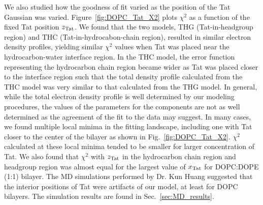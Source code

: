 We also studied how the goodness of fit varied as the position of 
the Tat Gaussian was varied. Figure~\ref{fig:DOPC_Tat_X2} plots $\chi^2$ as a 
function of the fixed Tat position $z_\textrm{Tat}$. We found that the two models,
THG (Tat-in-headgroup region) and THC (Tat-in-hydrocabon-chain region), resulted 
in similar electron density profiles, yielding similar $\chi^2$ values 
when Tat was placed near the hydrocarbon-water interface region. In the THC model, 
the error function representing the hydrocarbon chain region became wider as
Tat was placed closer to the interface region such that 
the total density profile calculated from the THC model was very similar to that calculated 
from the THG model.
In general, while the total electron density profile is well determined by 
our modeling procedures, the values of the parameters for the components are 
not as well determined as the agreement of the fit to the data may suggest. 
In many cases, we found multiple local minima in the fitting landscape, 
including one with Tat closer to the center of the bilayer as
shown in Fig.~\ref{fig:DOPC_Tat_X2}. $\chi^2$ calculated at these local minima 
tended to be smaller for larger concentration of Tat. We also found
that $\chi^2$ with $z_\textrm{Tat}$ in the hydrocarbon chain region and headgroup
region was almost equal for the largest value of $x_\textrm{Tat}$ for DOPC:DOPE (1:1)
bilayer.
The MD simulations performed by Dr. Kun Huang suggested that
the interior positions of Tat were artifacts of our model, at least for DOPC
bilayers. The simulation results are found in Sec.~\ref{sec:MD_results}.


